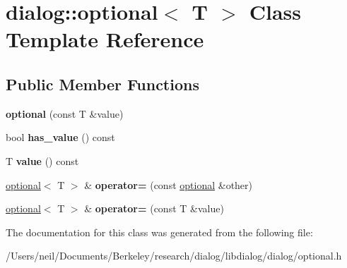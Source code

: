 \hypertarget{classdialog_1_1optional}{}\section{dialog\+:\+:optional$<$ T $>$ Class Template Reference}
\label{classdialog_1_1optional}
\subsection*{Public Member Functions}
\begin{DoxyCompactItemize}
\item 
\mbox{\label{classdialog_1_1optional_a27b3c28ea260917f0ba6e685c87e2ed9}} 
{\bfseries optional} (const T \&value)
\item 
\mbox{\label{classdialog_1_1optional_a4456cfc38b950757f4deff9bae2d3541}} 
bool {\bfseries has\+\_\+value} () const
\item 
\mbox{\label{classdialog_1_1optional_a6eac173336d5fa82569a71b069c7ea4c}} 
T {\bfseries value} () const
\item 
\mbox{\label{classdialog_1_1optional_ae04ad3cc25107f5a9d08acf902f89c4e}} 
\hyperlink{classdialog_1_1optional}{optional}$<$ T $>$ \& {\bfseries operator=} (const \hyperlink{classdialog_1_1optional}{optional} \&other)
\item 
\mbox{\label{classdialog_1_1optional_abb6e46cec8e185b7a9968dd3e473d9a7}} 
\hyperlink{classdialog_1_1optional}{optional}$<$ T $>$ \& {\bfseries operator=} (const T \&value)
\end{DoxyCompactItemize}


The documentation for this class was generated from the following file\+:\begin{DoxyCompactItemize}
\item 
/\+Users/neil/\+Documents/\+Berkeley/research/dialog/libdialog/dialog/optional.\+h\end{DoxyCompactItemize}
